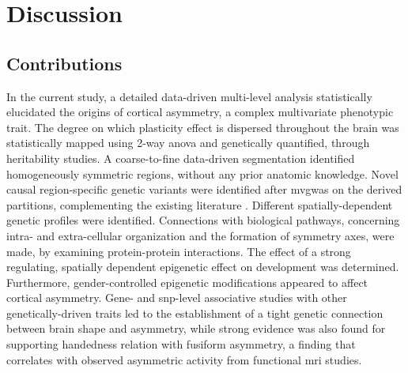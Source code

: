 \chapter{Discussion}\label{chap:discussion}
\section{Contributions}
In the current study, a detailed  data-driven multi-level analysis statistically elucidated the origins of cortical asymmetry, a complex multivariate phenotypic trait. The degree on which plasticity effect is dispersed throughout the brain was statistically mapped using 2-way \ac{anova} and genetically quantified, through heritability studies. A coarse-to-fine data-driven segmentation identified homogeneously symmetric regions, without any prior anatomic knowledge.  Novel causal region-specific genetic variants were identified after \ac{mvgwas} on the derived partitions, complementing the existing literature \cite{Sha2021}. Different spatially-dependent genetic profiles were identified. Connections with biological pathways, concerning intra- and extra-cellular organization and the formation of symmetry axes, were made, by examining protein-protein interactions. The effect of a strong regulating, spatially dependent epigenetic effect on development was determined. Furthermore, gender-controlled epigenetic modifications appeared to affect cortical asymmetry. Gene- and \ac{snp}-level associative studies  with other genetically-driven traits led to the establishment of a tight genetic connection between  brain shape and asymmetry, while strong evidence was also found for supporting handedness relation with fusiform asymmetry, a finding that correlates with observed asymmetric activity from functional \ac{mri} studies.
